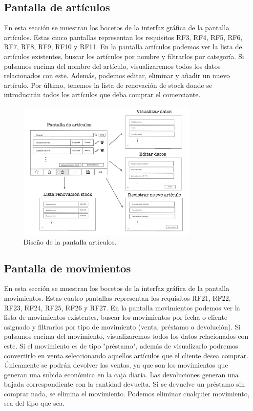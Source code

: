 \newpage

\subsection{Pantalla de artículos}

En esta sección se muestran los bocetos de la interfaz gráfica de la pantalla artículos. Estas cinco pantallas representan los requisitos RF3, RF4, RF5, RF6, RF7, RF8, RF9, RF10 y RF11. En la pantalla artículos podemos ver la lista de artículos existentes, buscar los artículos por nombre y filtrarlos por categoría. Si pulsamos encima del nombre del artículo, visualizaremos todos los datos relacionados con este. Además, podemos editar, eliminar y añadir un nuevo artículo. Por último, tenemos la lista de renovación de stock donde se introducirán todos los artículos que deba comprar el comerciante. 


\begin{figure}[ht]
	\centering
	\includegraphics[width=0.8\textwidth, angle=270]{imagenes/pantalla_articulos.JPG}
	\caption{Diseño de la pantalla artículos.}
	\label{fig:pantallaarticulos}
\end{figure}

\newpage


\subsection{Pantalla de movimientos}

En esta sección se muestran los bocetos de la interfaz gráfica de la pantalla movimientos. Estas cuatro pantallas representan los requisitos RF21, RF22, RF23, RF24, RF25, RF26 y RF27. En la pantalla movimientos podemos ver la lista de movimientos existentes, buscar los movimientos por fecha o cliente asignado y filtrarlos por tipo de movimiento (venta, préstamo o devolución). Si pulsamos encima del movimiento, visualizaremos todos los datos relacionados con este. Si el movimiento es de tipo "préstamo", además de visualizarlo podremos convertirlo en venta seleccionando aquellos artículos que el cliente desea comprar. Únicamente se podrán devolver las ventas, ya que son los movimientos que generan una subida económica en la caja diaria. Las devoluciones generan una bajada correspondiente con la cantidad devuelta. Si se devuelve un préstamo sin comprar nada, se elimina el movimiento. Podemos eliminar cualquier movimiento, sea del tipo que sea. 


